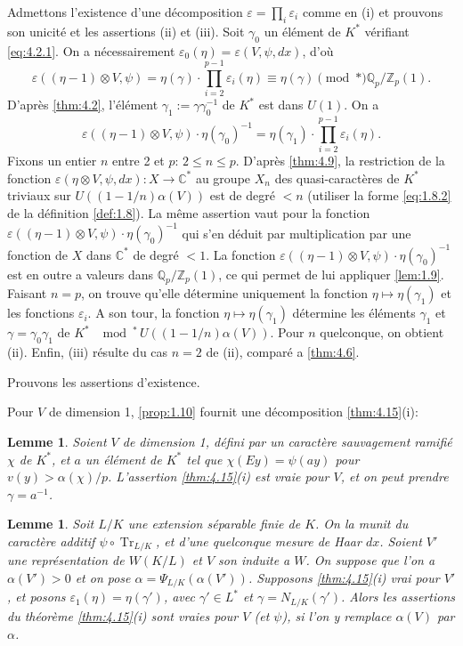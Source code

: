 \documentclass[12pt,a4paper]{article}
\theoremstyle{plain}
\newtheorem{lemma}[theorem]{Lemme}
\theoremstyle{definition}
\theoremstyle{remark}
\DeclareMathOperator{\Tr}{Tr}
\newcommand{\bQ}{\mathbb{Q}}
\newcommand{\bZ}{\mathbb{Z}}
\newcommand{\bC}{\mathbb{C}}
\providecommand{\Tr}{\operatorname{Tr}}
\begin{document}
Admettons l'existence d'une d\'ecomposition $\varepsilon = \prod_i \varepsilon_i$ comme en (i) et prouvons son unicit\'e et les assertions (ii) et (iii). Soit $\gamma_0$ un \'el\'ement de $K^*$ v\'erifiant \eqref{eq:4.2.1}. On a n\'ecessairement $\varepsilon_0(\eta) = \varepsilon(V, \psi, dx)$, d'o\`u
\[
\varepsilon((\eta-1) \otimes V, \psi) = \eta(\gamma) \cdot \prod_{i=2}^{p-1} \varepsilon_i(\eta) \equiv \eta(\gamma) \pmod{*} \bQ_p/\bZ_p(1).
\]
D'apr\`es \ref{thm:4.2}, l'\'el\'ement $\gamma_1 := \gamma \gamma_0^{-1}$ de $K^*$ est dans $U(1)$. On a
\[
\varepsilon((\eta-1) \otimes V, \psi) \cdot \eta(\gamma_0)^{-1} = \eta(\gamma_1) \cdot \prod_{i=2}^{p-1} \varepsilon_i(\eta).
\]
Fixons un entier $n$ entre 2 et $p$: $2 \leq n \leq p$. D'apr\`es \ref{thm:4.9}, la restriction de la fonction $\varepsilon(\eta \otimes V, \psi, dx): X \to \bC^*$ au groupe $X_n$ des quasi-caract\`eres de $K^*$ triviaux sur $U((1-1/n)\alpha(V))$ est de degr\'e $< n$ (utiliser la forme \eqref{eq:1.8.2} de la d\'efinition \ref{def:1.8}). La m\^eme assertion vaut pour la fonction $\varepsilon((\eta-1) \otimes V, \psi) \cdot \eta(\gamma_0)^{-1}$ qui s'en d\'eduit par multiplication par une fonction de $X$ dans $\bC^*$ de degr\'e $< 1$. La fonction $\varepsilon((\eta-1) \otimes V, \psi) \cdot \eta(\gamma_0)^{-1}$ est en outre a valeurs dans $\bQ_p/\bZ_p(1)$, ce qui permet de lui appliquer \ref{lem:1.9}. Faisant $n=p$, on trouve qu'elle d\'etermine uniquement la fonction $\eta \mapsto \eta(\gamma_1)$ et les fonctions $\varepsilon_i$. A son tour, la fonction $\eta \mapsto \eta(\gamma_1)$ d\'etermine les \'el\'ements $\gamma_1$ et $\gamma = \gamma_0 \gamma_1$ de $K^*$ $\mod^*\, U((1-1/n)\alpha(V))$. Pour $n$ quelconque, on obtient (ii). Enfin, (iii) r\'esulte du cas $n=2$ de (ii), compar\'e a \ref{thm:4.6}.

Prouvons les assertions d'existence.

Pour $V$ de dimension 1, \ref{prop:1.10} fournit une d\'ecomposition \ref{thm:4.15}(i):

\begin{lemma}\label{lem:4.16}
Soient $V$ de dimension 1, d\'efini par un caract\`ere sauvagement ramifi\'e $\chi$ de $K^*$, et $a$ un \'el\'ement de $K^*$ tel que $\chi(Ey) = \psi(ay)$ pour $v(y) > \alpha(\chi)/p$. L'assertion \ref{thm:4.15}(i) est vraie pour $V$, et on peut prendre $\gamma = a^{-1}$.
\end{lemma}

\begin{lemma}\label{lem:4.17}
Soit $L/K$ une extension s\'eparable finie de $K$. On la munit du caract\`ere additif $\psi \circ \Tr_{L/K}$, et d'une quelconque mesure de Haar $dx$. Soient $V'$ une repr\'esentation de $W(K/L)$ et $V$ son induite a $W$. On suppose que l'on a $\alpha(V') > 0$ et on pose $\alpha = \Psi_{L/K}(\alpha(V'))$. Supposons \ref{thm:4.15}(i) vrai pour $V'$, et posons $\varepsilon_1(\eta) = \eta(\gamma')$, avec $\gamma' \in L^*$ et $\gamma = N_{L/K}(\gamma')$. Alors les assertions du th\'eor\`eme \ref{thm:4.15}(i) sont vraies pour $V$ (et $\psi$), si l'on y remplace $\alpha(V)$ par $\alpha$.
\end{lemma}
\end{document}

